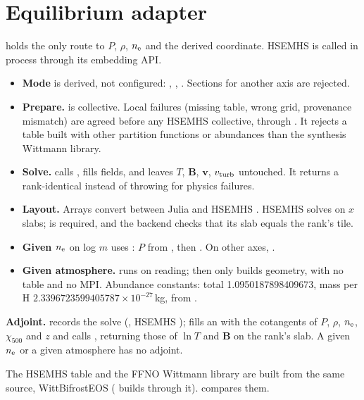 \section{Equilibrium adapter}
 holds the only route to $P$, $\rho$, $n_{\rm e}$ and the derived coordinate. HSEMHS is called in process through its embedding API.
\begin{itemize}
\item \textbf{Mode} is derived, not configured: , , . Sections for another axis are rejected.
\item \textbf{Prepare.}  is collective. Local failures (missing table, wrong grid, provenance mismatch) are agreed before any HSEMHS collective, through . It rejects a table built with other partition functions or abundances than the synthesis Wittmann library.
\item \textbf{Solve.}  calls , fills fields, and leaves $T$, $\mathbf B$, $\mathbf v$, $v_{\rm turb}$ untouched. It returns a rank-identical  instead of throwing for physics failures.
\item \textbf{Layout.} Arrays convert between Julia  and HSEMHS . HSEMHS solves on $x$ slabs;  is required, and the backend checks that its slab equals the rank's tile.
\item \textbf{Given $n_{\rm e}$} on log $m$ uses : $P$ from , then . On other axes, .
\item \textbf{Given atmosphere.}  runs on reading;  then only builds geometry, with no table and no MPI. Abundance constants: total 1.0950187898409673, mass per H $2.3396723599405787\times10^{-27}$\,kg, from .
\end{itemize}
\textbf{Adjoint.}  records the solve (, HSEMHS );  fills an  with the cotangents of $P$, $\rho$, $n_{\rm e}$, $\chi_{500}$ and $z$ and calls , returning those of $\ln T$ and $\mathbf B$ on the rank's slab. A given $n_{\rm e}$ or a given atmosphere has no adjoint.

The HSEMHS table and the FFNO Wittmann library are built from the same source, WittBifrostEOS ( builds  through it).  compares them.

